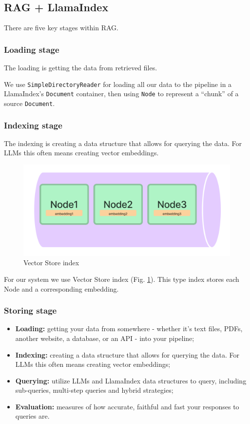 \documentclass[conference, 11pt]{IEEEtran}
\begin{document}
\subsection{RAG + LlamaIndex}
There are five key stages within RAG.
\subsubsection{Loading stage}
The loading is getting the data from retrieved files. 

We use \texttt{SimpleDirectoryReader} for loading all our data to the pipeline in a LlamaIndex's \texttt{Document} container, then using \texttt{Node} to represent a ``chunk'' of a source \texttt{Document}.

\subsubsection{Indexing stage}
The indexing is creating a data structure that allows for querying the data. For LLMs this often means creating vector embeddings.

\begin{figure}[h]
\centering
\includegraphics[width=0.8\linewidth]{vector_store.png}
\caption{Vector Store index}
\label{fig:vector_store}
\end{figure}

For our system we use Vector Store index (Fig. \ref{fig:vector_store}). This type index stores each Node and a corresponding embedding.

\subsubsection{Storing stage}

\begin{itemize}
    \item \textbf{Loading:} getting your data from somewhere - whether it's text files, PDFs, another website, a database, or an API - into your pipeline;
    \item \textbf{Indexing:} creating a data structure that allows for querying the data. For LLMs this often means creating vector embeddings;
    \item \textbf{Querying:} utilize LLMs and LlamaIndex data structures to query, including sub-queries, multi-step queries and hybrid strategies;
    \item \textbf{Evaluation:} measures of how accurate, faithful and fast your responses to queries are.
\end{itemize}
\end{document}
